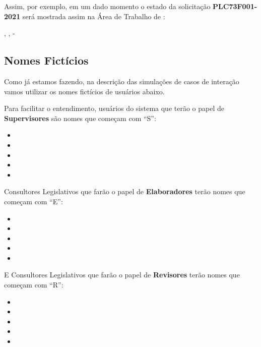 \begin{landscape}
	Assim, por exemplo, em um dado momento o estado da solicitação \textbf{PLC73F001-2021} será mostrada assim na Área de Trabalho de \EU:
	
	
	{}{\EU, \ET, \EC}{-}{\EU}
	
	
	\pagebreak
	
\subsection*{Nomes Fictícios}
	
Como já estamos fazendo, na descrição das simulações de casos de interação vamos utilizar os nomes fictícios de usuários abaixo.

Para facilitar o entendimento, usuários do sistema que terão o papel de \textbf{Supervisores} são nomes que começam com ``S'':

\begin{multicols}{3}
\begin{itemize}
	\item \SU
	\item \SD
	\item \ST
	\item \SQ
	\item \SC
\end{itemize}
\end{multicols}

Consultores Legislativos que farão o papel de \textbf{Elaboradores} terão nomes que começam com ``E'':
\begin{multicols}{3}
\begin{itemize}
	\item \EU
	\item \ED
	\item \ET
	\item \EQ
	\item \EC
\end{itemize}
\end{multicols}

E Consultores Legislativos que farão o papel de \textbf{Revisores} terão nomes que começam com ``R'':
\begin{multicols}{3}
\begin{itemize}
	\item \RU
	\item \RD
	\item \RT
	\item \RQ
	\item \RC
\end{itemize}
\end{multicols}
\end{landscape}

\pagebreak